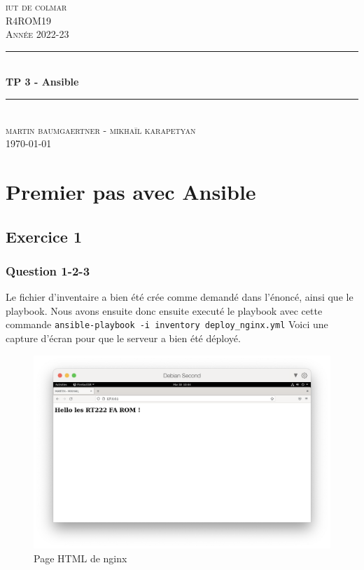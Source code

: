 \documentclass[12pt, a4paper]{article}
\begin{document}
\begin{titlepage}
	\newcommand{\HRule}{\rule{\linewidth}{0.5mm}} 
	\center 
	\textsc{\LARGE iut de colmar}\\[6.5cm] 
	\textsc{\Large R4ROM19}\\[0.5cm] 
	\textsc{\large Année 2022-23}\\[0.5cm]
	\HRule\\[0.75cm]
	{\huge\bfseries TP 3 - Ansible}\\[0.4cm]
	\HRule\\[1.5cm]
	\textsc{\large martin baumgaertner - mikhaïl karapetyan}\\[6.5cm] 

	\vfill\vfill\vfill
	{\large\today} 
	\vfill
\end{titlepage}
\newpage
\tableofcontents
\newpage
\section{Premier pas avec Ansible}
\subsection{Exercice 1}
\subsubsection{Question 1-2-3}
Le fichier d'inventaire a bien été crée comme demandé dans l'énoncé, ainsi 
que le playbook. Nous avons ensuite donc ensuite executé le playbook avec
cette commande \texttt{ansible-playbook -i inventory deploy\_nginx.yml}
Voici une capture d'écran pour que le serveur a bien été déployé.
\begin{figure}[h]
    \centering
    \includegraphics[width=1\textwidth]{img/nginx.png}
    \caption{Page HTML de nginx}
    \label{fig:1}
\end{figure}\\
\end{document}
